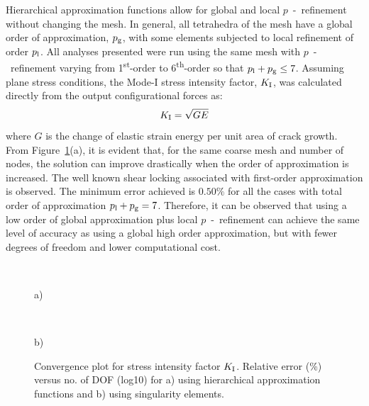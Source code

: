 \documentclass[onecolumn]{svjour3}
\begin{document}
Hierarchical approximation functions allow for global and local $p$~-~refinement without changing the mesh.
In general, all tetrahedra of the mesh have a global order of approximation, $p_{\rm g}$, with some elements subjected to local refinement of order $p_{\rm{l}}$.
All analyses presented were run using the same mesh with $p$~-~refinement varying from 1\textsuperscript{st}-order to 6\textsuperscript{th}-order so that $p_{\rm l} + p_{\rm g} \leq 7$.
Assuming plane stress conditions, the Mode-I stress intensity factor, $K_{\rm I}$, was calculated directly from the output configurational forces as: 
\begin{equation}\label{eq:SIF_g_c}
K_{\rm I} = \sqrt{GE}
\end{equation}
where $G$ is the change of elastic strain energy per unit area of crack growth.
From Figure~\ref{fig:plate_conv}(a), it is evident that, for the same coarse mesh and number of nodes, the solution can improve drastically when the order of approximation is increased. 
The well known shear locking associated with first-order approximation is observed. 
The minimum error achieved is $0.50\%$ for all the cases with total order of approximation  $p_{\rm l} + p_{\rm g} = 7$. 
Therefore, it can be observed that using a low order of global approximation plus local $p$~-~refinement 
can achieve the same level of accuracy as using a global high order approximation, but with fewer degrees of freedom and lower computational cost.
\begin{figure}[h]
	\centering

	
	\begin{minipage}{.45\textwidth}
		\\
		\begin{centering} a) \end{centering}
	\end{minipage}%
	\begin{minipage}{.45\textwidth}
		\\
\begin{centering} b) \end{centering}
	\end{minipage}
	\caption{Convergence plot for stress intensity factor $K_{\rm I}$. Relative error (\%) versus no. of DOF (log10) for a) using hierarchical approximation functions and b) using singularity elements.}
			\label{fig:plate_conv}
\end{figure}
\end{document}
